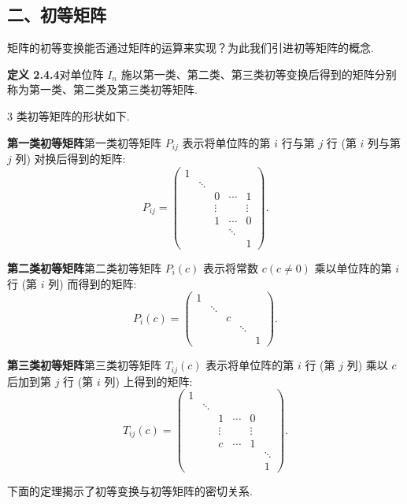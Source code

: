 \documentclass[UTF8, 12pt, fontset=fandol, oneside]{ctexart}
\begin{document}
\subsection*{二、初等矩阵}

矩阵的初等变换能否通过矩阵的运算来实现？为此我们引进初等矩阵的概念.

\noindent\textbf{定义 2.4.4}\quad 对单位阵 $I_n$ 施以第一类、第二类、第三类初等变换后得到的矩阵分别称为第一类、第二类及第三类初等矩阵.

3 类初等矩阵的形状如下.

\noindent\textbf{第一类初等矩阵}\quad 第一类初等矩阵 $P_{ij}$ 表示将单位阵的第 $i$ 行与第 $j$ 行 (第 $i$ 列与第 $j$ 列) 对换后得到的矩阵:
\[
P_{ij}=\left(\begin{array}{ccccc}
1 & & & &\\
& \ddots & & &\\
& & 0 & \cdots & 1\\
& & \vdots & & \vdots\\
& & 1 & \cdots & 0\\
& & & \ddots &\\
& & & & 1
\end{array}\right).
\]

\noindent\textbf{第二类初等矩阵}\quad 第二类初等矩阵 $P_i(c)$ 表示将常数 $c(c\ne 0)$ 乘以单位阵的第 $i$ 行 (第 $i$ 列) 而得到的矩阵:
\[
P_i(c)=\left(\begin{array}{ccccc}
1 & & & &\\
& \ddots & & &\\
& & c & &\\
& & & \ddots &\\
& & & & 1
\end{array}\right).
\]

\noindent\textbf{第三类初等矩阵}\quad 第三类初等矩阵 $T_{ij}(c)$ 表示将单位阵的第 $i$ 行 (第 $j$ 列) 乘以 $c$ 后加到第 $j$ 行 (第 $i$ 列) 上得到的矩阵:
\[
T_{ij}(c)=\left(\begin{array}{cccccc}
1 & & & & &\\
& \ddots & & & &\\
& & 1 & \cdots & 0 &\\
& & \vdots & & \vdots &\\
& & c & \cdots & 1 &\\
& & & & & \ddots\\
& & & & & 1
\end{array}\right).
\]

下面的定理揭示了初等变换与初等矩阵的密切关系.
\end{document}
